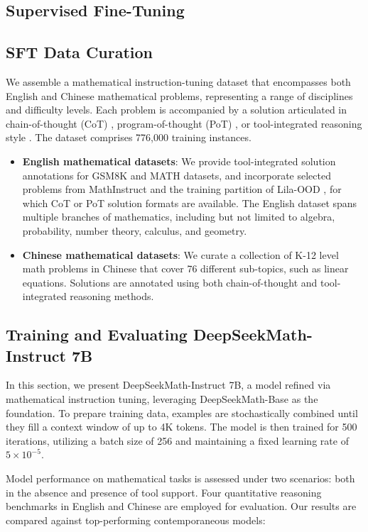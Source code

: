 \begin{itemize}[topsep=0pt]
\section{Supervised Fine-Tuning}

\subsection{SFT Data Curation}

We assemble a mathematical instruction-tuning dataset that encompasses both English and Chinese mathematical problems, representing a range of disciplines and difficulty levels. Each problem is accompanied by a solution articulated in chain-of-thought (CoT) \citep{cot}, program-of-thought (PoT) \citep{pot,pal}, or tool-integrated reasoning style \citep{tora}. The dataset comprises 776,000 training instances.

\begin{itemize}[topsep=0pt]
    \item \textbf{English mathematical datasets}: We provide tool-integrated solution annotations for GSM8K and MATH datasets, and incorporate selected problems from MathInstruct \citep{MathInstruct} and the training partition of Lila-OOD \citep{lila}, for which CoT or PoT solution formats are available. The English dataset spans multiple branches of mathematics, including but not limited to algebra, probability, number theory, calculus, and geometry.
    \item \textbf{Chinese mathematical datasets}: We curate a collection of K-12 level math problems in Chinese that cover 76 different sub-topics, such as linear equations. Solutions are annotated using both chain-of-thought and tool-integrated reasoning methods.
\end{itemize}

\subsection{Training and Evaluating DeepSeekMath-Instruct 7B}

In this section, we present DeepSeekMath-Instruct 7B, a model refined via mathematical instruction tuning, leveraging DeepSeekMath-Base as the foundation. To prepare training data, examples are stochastically combined until they fill a context window of up to 4K tokens. The model is then trained for 500 iterations, utilizing a batch size of 256 and maintaining a fixed learning rate of $5\times10^{-5}$.

Model performance on mathematical tasks is assessed under two scenarios: both in the absence and presence of tool support. Four quantitative reasoning benchmarks in English and Chinese are employed for evaluation. Our results are compared against top-performing contemporaneous models:


\end{itemize}
